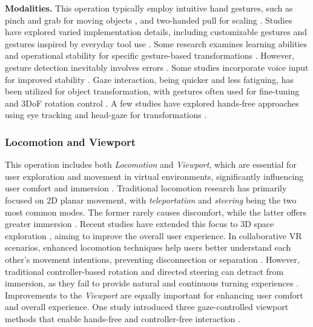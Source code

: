 \documentclass[review]{fcs}
\begin{document}
\textbf{Modalities.}
This operation typically employ intuitive hand gestures, such as pinch and grab for moving objects \cite{DBLP:conf/vr/QuereMJWW24}, and two-handed pull for scaling \cite{DBLP:conf/chi/CaoKWAX24}. Studies have explored varied implementation details, including customizable gestures \cite{DBLP:conf/chi/CaoKWAX24} and gestures inspired by everyday tool use \cite{DBLP:conf/chi/PeiCLZ22}. Some research examines learning abilities and operational stability for specific gesture-based transformations \cite{DBLP:conf/chi/CaoKWAX24}.
However, gesture detection inevitably involves errors \cite{DBLP:conf/chi/CaoKWAX24}. Some studies incorporate voice input for improved stability \cite{DBLP:conf/chi/CaoKWAX24,DBLP:conf/uist/LiaoKJKS22}. Gaze interaction, being quicker and less fatiguing, has been utilized for object transformation, with gestures often used for fine-tuning and 3DoF rotation control \cite{DBLP:conf/chi/HouNSKBG23}. A few studies have explored hands-free approaches using eye tracking and head-gaze for transformations \cite{DBLP:conf/chi/HouNSKBG23}.

\subsubsection{Locomotion and Viewport}
This operation includes both \textit{Locomotion} and \textit{Viewport}, which are essential for user exploration and movement in virtual environments, significantly influencing user comfort and immersion \cite{DBLP:conf/vr/SinJLLLN24}. Traditional locomotion research has primarily focused on 2D planar movement, with \textit{teleportation} and \textit{steering} being the two most common modes. The former rarely causes discomfort, while the latter offers greater immersion \cite{DBLP:conf/vr/HombeckVHDL23}. Recent studies have extended this focus to 3D space exploration \cite{DBLP:conf/vr/SinJLLLN24,DBLP:conf/vr/SindhupathirajaUDH24}, aiming to improve the overall user experience. In collaborative VR scenarios, enhanced locomotion techniques help users better understand each other's movement intentions, preventing disconnection or separation \cite{DBLP:conf/chi/RaschRS023}. However, traditional controller-based rotation and directed steering can detract from immersion, as they fail to provide natural and continuous turning experiences \cite{DBLP:conf/vr/HombeckVHDL23}.
Improvements to the \textit{Viewport} are equally important for enhancing user comfort and overall experience. One study introduced three gaze-controlled viewport methods that enable hands-free and controller-free interaction \cite{DBLP:conf/chi/LeeWSG24}.
\end{document}
